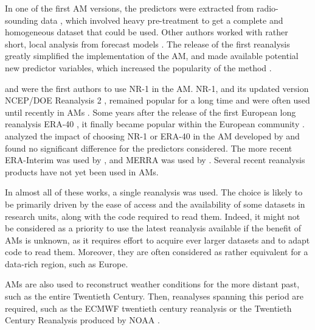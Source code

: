 \documentclass{ametsoc}
\begin{document}
	In one of the first AM versions, the predictors were extracted from radio-sounding data \citep{Duband1981}, which involved heavy pre-treatment to get a complete and homogeneous dataset that could be used. Other authors worked with rather short, local analysis from forecast models \cite[for example][]{Kruizinga1983, VandenDool1989}. The release of the first reanalysis \citep[NCEP/NCAR Reanalysis I, NR-1 --][]{Kalnay1996, Kistler2001} greatly simplified the implementation of the AM, and made available potential new predictor variables, which increased the popularity of the method \citep{Timbal2008a}.
	
	\citet{Timbal2003} and \citet{Bontron2004} were the first authors to use NR-1 in the AM. NR-1, and its updated version NCEP/DOE Reanalysis 2 \citep[NR-2 --][]{Kanamitsu2002}, remained popular for a long time and were often used until recently in AMs \citep{Wetterhall2005a, Gangopadhyay2005, Altava-Ortiz2006, Barrera2007, Cannon2007, Matulla2007, Bliefernicht2007, Maurer2008, Wu2012, Marty2012, Teng2012, Horton2012, Yiou2014}. Some years after the release of the first European long reanalysis ERA-40 \citep{Uppala2005}, it finally became popular within the European community \citep {Willems2011b, JakobThemessl2011a, BenDaoud2011, Turco2011a, Franke2011, Pascual2012b, Schenk2012, Ribalaygua2013a, Osca2013, Radanovics2013, Martin2014b, Chardon2014, BenDaoud2016}. \citet{BenDaoud2009} analyzed the impact of choosing NR-1 or ERA-40 in the AM developed by \citet{Bontron2004} and found no significant difference for the predictors considered. The more recent ERA-Interim \citep[ERA-INT, ][]{Dee2011a} was used by \cite{Raynaud2016b}, and MERRA \citep{Rienecker2011} was used by \citet{Vanvyve2015}. Several recent reanalysis products have not yet been used in AMs.
	
	In almost all of these works, a single reanalysis was used. The choice is likely to be primarily driven by the ease of access and the availability of some datasets in research units, along with the code required to read them. Indeed, it might not be considered as a priority to use the latest reanalysis available if the benefit of AMs is unknown, as it requires effort to acquire ever larger datasets and to adapt code to read them. Moreover, they are often considered as rather equivalent for a data-rich region, such as Europe.
	
	AMs are also used to reconstruct weather conditions for the more distant past, such as the entire Twentieth Century. Then, reanalyses spanning this period are required, such as the ECMWF twentieth century reanalysis \citep[ERA-20C --][]{Poli2016} or the Twentieth Century Reanalysis \citep[20CR --][]{Compo2011} produced by NOAA \citep[for example,][]{Kuentz2015, Caillouet2016, Brigode2016, Bonnet2017}. 
	
\end{document}
